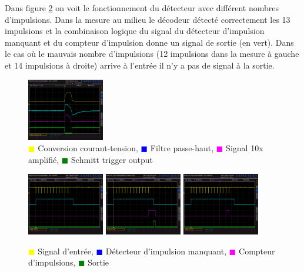 \documentclass[french]{layout/Report}
\begin{document}
Dans figure \ref{fig:decoder_signal} on voit le fonctionnement du détecteur avec différent nombres d'impulsions.
Dans la mesure au milieu le décodeur détecté correctement les 13 impulsions et la combinaison logique
du signal du détecteur d'impulsion manquant et du compteur d'impulsion donne un signal de sortie (en vert).
Dans le cas où le mauvais nombre  d'impulsions (12 impulsions dans la mesure à gauche et 14 impulsions à droite)
arrive à l'entrée il n'y a pas de signal à la sortie.

\begin{figure}[H]
\centering
\includegraphics[width=0.3\textwidth]{../measurements/SCR03}
\caption{
\textcolor{yellow}{$\blacksquare$} Conversion courant-tension,
\textcolor{blue}{$\blacksquare$} Filtre passe-haut,
\textcolor{magenta}{$\blacksquare$} Signal 10x amplifié,
\textcolor{green}{$\blacksquare$} Schmitt trigger output
}
\label{fig:filter_signal}
\end{figure}

\begin{figure}[H]
\centering
\includegraphics[width=0.3\textwidth]{../measurements/SCR06}
\includegraphics[width=0.3\textwidth]{../measurements/SCR07}
\includegraphics[width=0.3\textwidth]{../measurements/SCR08}
\caption{
\textcolor{yellow}{$\blacksquare$} Signal d'entrée,
\textcolor{blue}{$\blacksquare$} Détecteur d'impulsion manquant,
\textcolor{magenta}{$\blacksquare$} Compteur d'impulsions,
\textcolor{green}{$\blacksquare$} Sortie
}
\label{fig:decoder_signal}
\end{figure}
\end{document}
